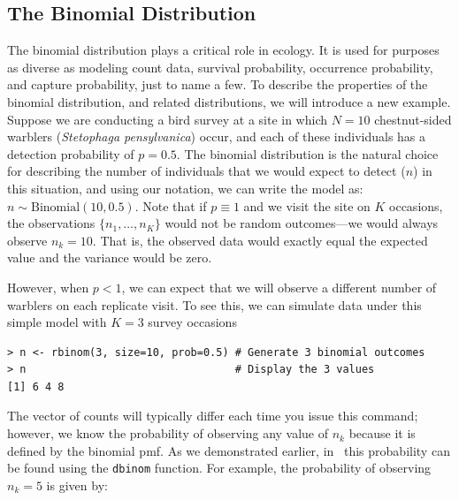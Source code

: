 \subsection{The Binomial Distribution}

The binomial distribution plays a critical role in ecology. It is
used for purposes as diverse as modeling count data, survival
probability, occurrence probability, and capture probability, just to
name a few.
To describe the properties of the binomial distribution, and related
distributions, we will introduce a new example.
Suppose we are conducting a bird survey at a site in which $N=10$
chestnut-sided warblers (\textit{Stetophaga pensylvanica}) occur, and
each of these individuals has a detection probability of $p=0.5$. The
binomial distribution is the natural choice for describing the number
of individuals that we would expect to detect ($n$) in this
situation, and using our notation, we can write the model as: $n \sim
\text{Binomial}(10, 0.5)$. Note that if $p \equiv 1$ and we visit the
site on $K$ occasions, the observations $\{n_1, \ldots, n_K\}$
would not be random outcomes---we would always observe
$n_k=10$. That is, the observed data would exactly equal the expected
value and the variance would be zero.

However, when $p<1$, we can expect that we will observe %
a different number of warblers on each replicate visit. To see this,
we can simulate data under this simple model with $K=3$ survey occasions
\begin{verbatim}
> n <- rbinom(3, size=10, prob=0.5) # Generate 3 binomial outcomes
> n                                 # Display the 3 values
[1] 6 4 8
\end{verbatim}
The vector of counts will typically differ each time you issue this
command; however, we know the probability of observing any value of
$n_k$ because it is defined by the binomial pmf. As we demonstrated
earlier, in \R~this probability can be found using the \verb+dbinom+
function. For example, the probability of observing $n_k=5$ is given by:

